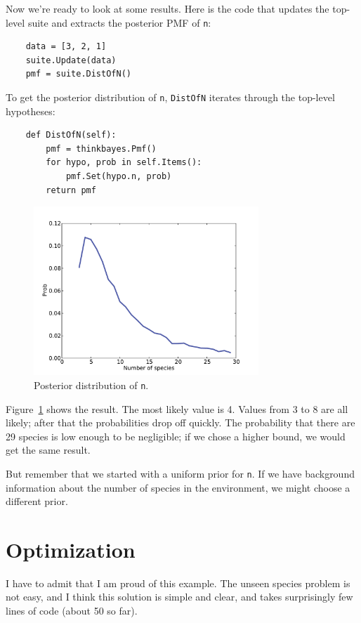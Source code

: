 \documentclass[12pt]{book}
\begin{document}
Now we're ready to look at some results.  Here is the code that
updates the top-level suite and extracts the posterior PMF of {\tt n}:

\begin{verbatim}
    data = [3, 2, 1]
    suite.Update(data)
    pmf = suite.DistOfN()
\end{verbatim}

To get the posterior distribution of {\tt n}, {\tt DistOfN} iterates
through the top-level hypotheses:

\begin{verbatim}
    def DistOfN(self):
        pmf = thinkbayes.Pmf()
        for hypo, prob in self.Items():
            pmf.Set(hypo.n, prob)
        return pmf
\end{verbatim}

\begin{figure}
\centerline{\includegraphics[height=2.5in]{figs/species2.pdf}}
\caption{Posterior distribution of {\tt n}.}
\label{fig.species2}
\end{figure}

Figure~\ref{fig.species2} shows the result.  The most likely value is 4.
Values from 3 to 8 are all likely; after that the probabilities
drop off quickly.  The probability that there are 29 species is
low enough to be negligible; if we chose a higher bound, 
we would get the same result.

But remember that we started with a uniform prior for {\tt n}.  If we
have background information about the number of species in the
environment, we might choose a different prior.


\section{Optimization}

I have to admit that I am proud of this example.  The unseen species
problem is not easy, and I think this solution is simple and clear,
and takes surprisingly few lines of code (about 50 so far).
\end{document}
